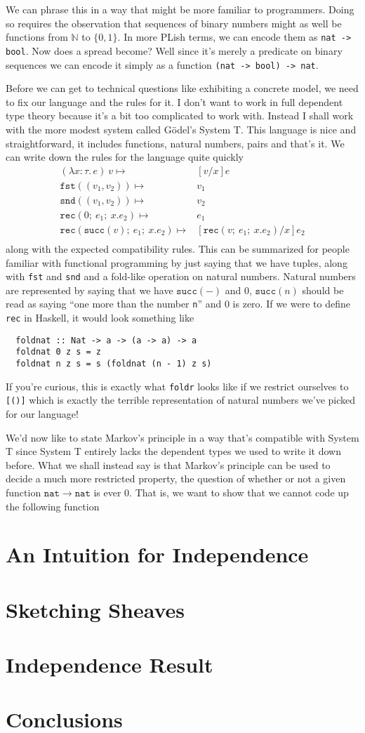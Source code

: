 \documentclass[12pt]{amsart}
\newcommand{\lam}[3]{\lambda #1 : #2.\, #3}
\newcommand{\ap}[2]{#1\ #2}
\newcommand{\prl}[1]{\mathtt{fst}(#1)}
\newcommand{\prr}[1]{\mathtt{snd}(#1)}
\newcommand{\natrec}[3]{\mathtt{rec}(#1;\ #2;\ #3)}
\newcommand{\nat}{\mathtt{nat}}
\renewcommand{\succ}[1]{\mathtt{succ}(#1)}
\begin{document}
We can phrase this in a way that might be more familiar to
programmers. Doing so requires the observation that sequences of
binary numbers might as well be functions from $\mathbb{N}$ to
$\{0, 1\}$. In more PLish terms, we can encode them as
{\tt nat -> bool}. Now does a spread become? Well since it's merely a
predicate on binary sequences we can encode it simply as a function
{\tt (nat -> bool) -> nat}.


Before we can get to technical questions like exhibiting a concrete
model, we need to fix our language and the rules for it. I don't want
to work in full dependent type theory because it's a bit too
complicated to work with. Instead I shall work with the more modest
system called G\"odel's System T. This language is nice and
straightforward, it includes functions, natural numbers, pairs and that's
it. We can write down the rules for the language quite quickly
\begin{align*}
  \ap{(\lam{x}{\tau}{e})}{v} \mapsto& [v/x]e\\
  \prl{(v_1, v_2)} \mapsto& v_1\\
  \prr{(v_1, v_2)} \mapsto& v_2\\
  \natrec{0}{e_1}{x.e_2} \mapsto& e_1\\
  \natrec{\succ{v}}{e_1}{x.e_2} \mapsto& [\natrec{v}{e_1}{x.e_2}/x]e_2\\
\end{align*}
along with the expected compatibility rules. This can be summarized
for people familiar with functional programming by just saying that we
have tuples, along with {\tt fst} and {\tt snd} and a fold-like
operation on natural numbers. Natural numbers are represented by
saying that we have $\succ{-}$ and $0$, $\succ{n}$ should be read as saying
``one more than the number {\tt n}'' and 0 is zero. If we were to
define {\tt rec} in Haskell, it would look something like
\begin{verbatim}
  foldnat :: Nat -> a -> (a -> a) -> a
  foldnat 0 z s = z
  foldnat n z s = s (foldnat (n - 1) z s)
\end{verbatim}
If you're curious, this is exactly what {\tt foldr} looks like if we
restrict ourselves to {\tt [()]} which is exactly the terrible
representation of natural numbers we've picked for our language!

We'd now like to state Markov's principle in a way that's compatible
with System T since System T entirely lacks the dependent types we
used to write it down before. What we shall instead say is that
Markov's principle can be used to decide a much more restricted
property, the question of whether or not a given function
$\nat \to \nat$ is ever $0$. That is, we want to show that we cannot
code up the following function
\section{An Intuition for Independence}
\section{Sketching Sheaves}
\section{Independence Result}
\section{Conclusions}
\end{document}
